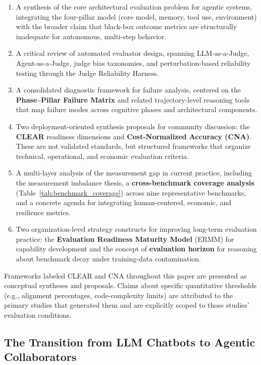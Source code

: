 \documentclass[11pt]{article}
\begin{document}
\begin{enumerate}
    \item A synthesis of the core architectural evaluation problem for agentic systems, integrating the four-pillar model (core model, memory, tool use, environment) with the broader claim that black-box outcome metrics are structurally inadequate for autonomous, multi-step behavior.
    \item A critical review of automated evaluator design, spanning LLM-as-a-Judge, Agent-as-a-Judge, judge bias taxonomies, and perturbation-based reliability testing through the Judge Reliability Harness.
    \item A consolidated diagnostic framework for failure analysis, centered on the \textbf{Phase--Pillar Failure Matrix} and related trajectory-level reasoning tools that map failure modes across cognitive phases and architectural components.
    \item Two deployment-oriented synthesis proposals for community discussion: the \textbf{CLEAR} readiness dimensions and \textbf{Cost-Normalized Accuracy (CNA)}. These are not validated standards, but structured frameworks that organize technical, operational, and economic evaluation criteria.
    \item A multi-layer analysis of the measurement gap in current practice, including the measurement imbalance thesis, a \textbf{cross-benchmark coverage analysis} (Table~\ref{tab:benchmark_coverage}) across nine representative benchmarks, and a concrete agenda for integrating human-centered, economic, and resilience metrics.
    \item Two organization-level strategy constructs for improving long-term evaluation practice: the \textbf{Evaluation Readiness Maturity Model} (ERMM) for capability development and the concept of \textbf{evaluation horizon} for reasoning about benchmark decay under training-data contamination.
\end{enumerate}

Frameworks labeled CLEAR and CNA throughout this paper are presented as conceptual syntheses and proposals. Claims about specific quantitative thresholds (e.g., alignment percentages, code-complexity limits) are attributed to the primary studies that generated them and are explicitly scoped to those studies' evaluation conditions.

\subsection{The Transition from LLM Chatbots to Agentic Collaborators}
\end{document}
